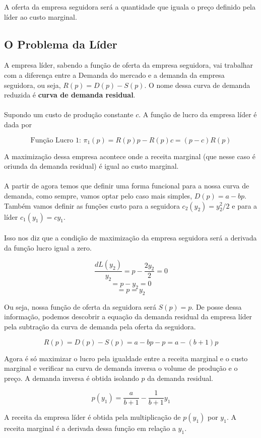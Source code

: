 \documentclass[a4paper,11pt,oneside]{book}
\theoremstyle{definition}
\theoremstyle{break}
\begin{document}
A oferta da empresa seguidora será a quantidade que iguala o preço definido pela líder ao custo marginal.

\subsection{O Problema da Líder}

A empresa líder, sabendo a função de oferta da empresa seguidora, vai trabalhar com a diferença entre a Demanda do mercado e a demanda da empresa seguidora, ou seja, $R(p) = D(p) - S(p)$. O nome dessa curva de demanda reduzida é \textbf{curva de demanda residual}.
\\
\\
Supondo um custo de produção constante $c$. A função de lucro da empresa líder é dada por

$$ \textrm{Função Lucro 1: } \pi_1(p) = R(p)p - R(p)c = (p - c)R(p)  $$

A maximização dessa empresa acontece onde a receita marginal (que nesse caso é oriunda da demanda residual) é igual ao custo marginal. 
\\
\\
A partir de agora temos que definir uma forma funcional para a nossa curva de demanda, como sempre, vamos optar pelo caso mais simples, $D(p) = a - bp$. Também vamos definir as funções custo para a seguidora $c_2(y_2) = y_2^2/2$ e para a líder $c_1(y_1) = cy_1$.
\\
\\
Isso nos diz que a condição de maximização da empresa seguidora será a derivada da função lucro igual a zero.

$$ \frac{d L(y_2)}{y_2} = p - \frac{2y_2}{2} = 0 $$
$$ = p - y_2 = 0 $$
$$ = p = y_2 $$

Ou seja, nossa função de oferta da seguidora será $S(p) = p$. De posse dessa informação, podemos descobrir a equação da demanda residual da empresa líder pela subtração da curva de demanda pela oferta da seguidora.

$$ R(p) = D(p) - S(p) = a - bp - p = a - (b + 1)p $$

Agora é só maximizar o lucro pela igualdade entre a receita marginal e o custo marginal e verificar na curva de demanda inversa o volume de produção e o preço. A demanda inversa é obtida isolando $p$ da demanda residual.

$$ p(y_1) = \frac{a}{b+1}-\frac{1}{b+1}y_1 $$

A receita da empresa líder é obtida pela multiplicação de $p(y_1)$ por $y_1$. A receita marginal é a derivada dessa função em relação a $y_1$.
\end{document}
